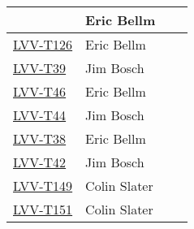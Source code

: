 \documentclass[DM,lsstdraft,STR,toc]{lsstdoc}
\begin{document}
{\begin{longtable}{p{3cm}p{3cm}p{3cm}p{6cm}}
& {\small Eric Bellm } & {\small  } &
\begin{minipage}[]{6cm}
\smallskip
{\small  }
\medskip
\end{minipage}
\\ \hline
\href{https://jira.lsstcorp.org/secure/Tests.jspa#/testCase/LVV-T126}{LVV-T126}
& {\small Eric Bellm } & {\small  } &
\begin{minipage}[]{6cm}
\smallskip
{\small  }
\medskip
\end{minipage}
\\ \hline
\href{https://jira.lsstcorp.org/secure/Tests.jspa#/testCase/LVV-T39}{LVV-T39}
& {\small Jim Bosch } & {\small  } &
\begin{minipage}[]{6cm}
\smallskip
{\small  }
\medskip
\end{minipage}
\\ \hline
\href{https://jira.lsstcorp.org/secure/Tests.jspa#/testCase/LVV-T46}{LVV-T46}
& {\small Eric Bellm } & {\small  } &
\begin{minipage}[]{6cm}
\smallskip
{\small  }
\medskip
\end{minipage}
\\ \hline
\href{https://jira.lsstcorp.org/secure/Tests.jspa#/testCase/LVV-T44}{LVV-T44}
& {\small Jim Bosch } & {\small  } &
\begin{minipage}[]{6cm}
\smallskip
{\small  }
\medskip
\end{minipage}
\\ \hline
\href{https://jira.lsstcorp.org/secure/Tests.jspa#/testCase/LVV-T38}{LVV-T38}
& {\small Eric Bellm } & {\small  } &
\begin{minipage}[]{6cm}
\smallskip
{\small  }
\medskip
\end{minipage}
\\ \hline
\href{https://jira.lsstcorp.org/secure/Tests.jspa#/testCase/LVV-T42}{LVV-T42}
& {\small Jim Bosch } & {\small  } &
\begin{minipage}[]{6cm}
\smallskip
{\small  }
\medskip
\end{minipage}
\\ \hline
\href{https://jira.lsstcorp.org/secure/Tests.jspa#/testCase/LVV-T149}{LVV-T149}
& {\small Colin Slater } & {\small  } &
\begin{minipage}[]{6cm}
\smallskip
{\small  }
\medskip
\end{minipage}
\\ \hline
\href{https://jira.lsstcorp.org/secure/Tests.jspa#/testCase/LVV-T151}{LVV-T151}
& {\small Colin Slater } & {\small  } &
\begin{minipage}[]{6cm}

\end{minipage}
\end{longtable}}
\end{document}
